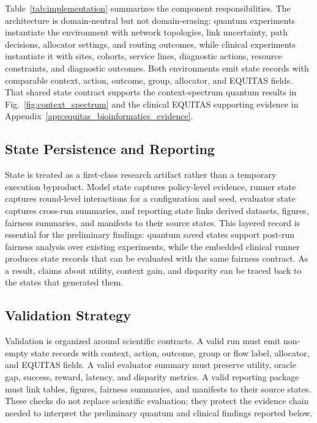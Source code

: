 \documentclass[conference]{IEEEtran}
\begin{document}
Table~\ref{tab:implementation} summarizes the component responsibilities. The
architecture is domain-neutral but not domain-erasing: quantum experiments
instantiate the environment with network topologies, link uncertainty, path
decisions, allocator settings, and routing outcomes, while clinical
experiments instantiate it with sites, cohorts, service lines, diagnostic
actions, resource constraints, and diagnostic outcomes. Both environments emit
state records with comparable context, action, outcome, group, allocator, and
EQUITAS fields. That shared state contract supports the context-spectrum
quantum results in Fig.~\ref{fig:context_spectrum} and the clinical EQUITAS
supporting evidence in Appendix~\ref{app:equitas_bioinformatics_evidence}.

\subsection{State Persistence and Reporting}
State is treated as a first-class research artifact rather than a temporary
execution byproduct. Model state captures policy-level evidence, runner state
captures round-level interactions for a configuration and seed, evaluator
state captures cross-run summaries, and reporting state links derived datasets,
figures, fairness summaries, and manifests to their source states. This layered
record is essential for the preliminary findings: quantum saved states support
post-run fairness analysis over existing experiments, while the embedded
clinical runner produces state records that can be evaluated with the same
fairness contract. As a result, claims about utility, context gain, and
disparity can be traced back to the states that generated them.

\subsection{Validation Strategy}
Validation is organized around scientific contracts. A valid run must emit
non-empty state records with context, action, outcome, group or flow label,
allocator, and EQUITAS fields. A valid evaluator summary must preserve utility,
oracle gap, success, reward, latency, and disparity metrics. A valid reporting
package must link tables, figures, fairness summaries, and manifests to their
source states. These checks do not replace scientific evaluation; they protect
the evidence chain needed to interpret the preliminary quantum and clinical
findings reported below.
\end{document}
